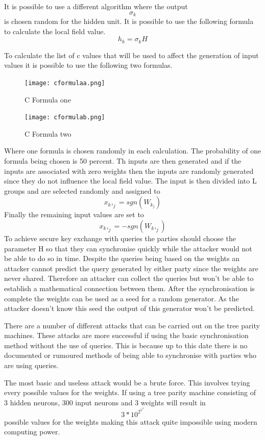 It is possible to use a different algorithm where the output \[\sigma_k \] is chosen random for the hidden unit.
It is possible to use the following formula to calculate the local field value. \[ h_k = \sigma_k H \]

To calculate the list of c values that will be used to affect the generation of input values it is possible to use the following two formulas. 
\begin{figure}[ht]
  \centering
      \texttt{[image: cformulaa.png]}
  \caption[C Formula one]{C Formula one\cite{Private_Inputs_to_Tree_Parity_Machine}}
  \label{fig:LocalFieldFormula}
\end{figure}
\begin{figure}[ht]
  \centering
      \texttt{[image: cformulab.png]}
  \caption[C Formula two]{C Formula two\cite{Private_Inputs_to_Tree_Parity_Machine}}
  \label{fig:LocalFieldFormula}
\end{figure}

Where one formula is chosen randomly in each calculation. The probability of one formula being chosen is 50 percent.
Th inputs are then generated and if the inputs are associated with zero weights then the inputs are randomly generated since they do not influence the local field value. 
The input is then divided into L groups and are selected randomly and assigned to \[x_k,_j = sgn(W_k_j) \]
Finally the remaining input values are set to  \[x_k,_j = -sgn(W_k,_j) \]
To achieve secure key exchange with queries the parties should choose the parameter H so that they can synchronise quickly while the attacker would not be able to do so in time.
Despite the queries being based on the weights an attacker cannot predict the query generated by either party since the weights are never shared. Therefore an attacker can collect the queries but won't be able to establish a mathematical connection between them.
After the synchronisation is complete the weights can be used as a seed for a random generator. As the attacker doesn't know this seed the output of this generator won't be predicted.

There are a number of different attacks that can be carried out on the tree parity machines. These attacks are  more successful if using the basic synchronisation method without the use of queries. This is because up to this date there is no documented or rumoured methods of being able to synchronise with parties who are using queries.

The most basic and useless attack would be a brute force.
This involves trying every possible values for the weights. If using a tree parity machine consisting of 3 hidden neurons, 300 input neurons and 3 weights will result \cite{Private_Inputs_to_Tree_Parity_Machine} in \[3*10^2^5^3\] possible values for the weights making this attack quite impossible using modern computing power. 

